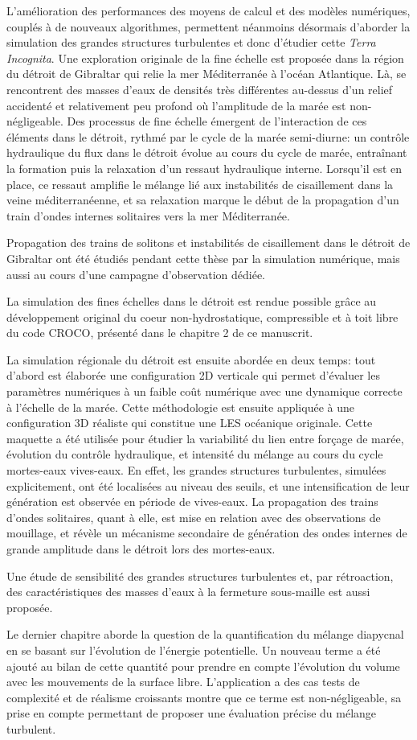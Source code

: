\documentclass[a4paper,12pt,notitlepage,twoside]{report}
\numberwithin{equation}{section}
\begin{document}
L'amélioration des performances des moyens de calcul et des modèles numériques, couplés à de nouveaux algorithmes, permettent néanmoins désormais d’aborder la simulation des grandes structures turbulentes et donc d’étudier cette \textit{Terra Incognita}. Une exploration originale de la fine échelle est proposée dans la région du détroit de Gibraltar qui relie la mer Méditerranée à l’océan Atlantique. Là, se rencontrent des masses d’eaux de densités très différentes au-dessus d’un relief accidenté et relativement peu profond où l’amplitude de la marée est non-négligeable. Des processus de fine échelle émergent de l’interaction de ces éléments dans le détroit, rythmé par le cycle de la marée semi-diurne: un contrôle hydraulique du flux dans le détroit évolue au cours du cycle de marée, entraînant la formation puis la relaxation d’un ressaut hydraulique interne. Lorsqu’il est en place, ce ressaut amplifie le mélange lié aux instabilités de cisaillement dans la veine méditerranéenne, et sa relaxation marque le début de la propagation d’un train d’ondes internes solitaires vers la mer Méditerranée.

Propagation des trains de solitons et instabilités de cisaillement dans le détroit de Gibraltar ont été étudiés pendant cette thèse par la simulation numérique, mais aussi au cours d’une campagne d’observation dédiée. 

La simulation des fines échelles dans le détroit est rendue possible grâce au développement original du coeur non-hydrostatique, compressible et à toit libre du code CROCO, présenté dans le chapitre 2 de ce manuscrit.

La simulation régionale du détroit est ensuite abordée en deux temps: tout d'abord est élaborée une configuration 2D verticale qui permet d'évaluer les paramètres numériques à un faible coût numérique avec une dynamique correcte à l’échelle de la marée. Cette méthodologie est ensuite appliquée à une configuration 3D réaliste qui constitue une  LES océanique originale. Cette maquette a été utilisée pour étudier la variabilité du lien entre forçage de marée, évolution du contrôle hydraulique, et intensité du mélange au cours du cycle mortes-eaux vives-eaux. En effet, les grandes structures turbulentes, simulées explicitement, ont été localisées au niveau des seuils, et une intensification de leur génération est observée en période de vives-eaux. La propagation des trains d’ondes solitaires, quant à elle, est mise en relation avec des observations de mouillage, et révèle un mécanisme secondaire de génération des ondes internes de grande amplitude dans le détroit lors des mortes-eaux. 

Une étude de sensibilité des grandes structures turbulentes et, par rétroaction, des caractéristiques des masses d’eaux à la fermeture sous-maille est aussi proposée.

Le dernier chapitre aborde la question de la quantification du mélange diapycnal en se basant sur l'évolution de l'énergie potentielle. Un nouveau terme a été ajouté au bilan de cette quantité pour prendre en compte l’évolution du volume avec les mouvements de la surface libre. L’application a des cas tests de complexité et de réalisme croissants montre que ce terme est non-négligeable, sa prise en compte permettant de proposer une évaluation précise du mélange turbulent.
\end{document}
